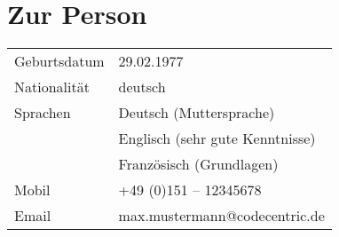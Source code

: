 \section*{Zur Person}
\begin{longtable}{@{}p{6cm}p{10cm}}
Geburtsdatum 	& 29.02.1977\\
Nationalität 	& deutsch\\
Sprachen 	& Deutsch (Muttersprache)\\
		& Englisch (sehr gute Kenntnisse)\\
		& Französisch (Grundlagen)\\
Mobil		& +49 (0)151 – 12345678\\
Email		& max.mustermann@codecentric.de
\end{longtable}

